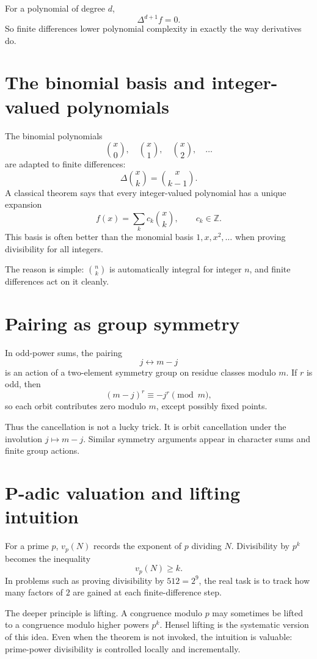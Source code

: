 For a polynomial of degree \(d\),
\[
  \Delta^{d+1}f=0.
\]
So finite differences lower polynomial complexity in exactly the way derivatives do.

\section{The binomial basis and integer-valued polynomials}

The binomial polynomials
\[
  \binom x0,\quad \binom x1,\quad \binom x2,\quad\ldots
\]
are adapted to finite differences:
\[
  \Delta\binom xk=\binom x{k-1}.
\]
A classical theorem says that every integer-valued polynomial has a unique expansion
\[
  f(x)=\sum_k c_k\binom xk,\qquad c_k\in\mathbb Z.
\]
This basis is often better than the monomial basis \(1,x,x^2,\ldots\) when proving divisibility for all integers.

The reason is simple: \(\binom nk\) is automatically integral for integer \(n\), and finite differences act on it cleanly.

\section{Pairing as group symmetry}

In odd-power sums, the pairing
\[
  j\longleftrightarrow m-j
\]
is an action of a two-element symmetry group on residue classes modulo \(m\).  If \(r\) is odd, then
\[
  (m-j)^r\equiv -j^r\pmod m,
\]
so each orbit contributes zero modulo \(m\), except possibly fixed points.

Thus the cancellation is not a lucky trick.  It is orbit cancellation under the involution \(j\mapsto m-j\).  Similar symmetry arguments appear in character sums and finite group actions.

\section{P-adic valuation and lifting intuition}

For a prime \(p\), \(v_p(N)\) records the exponent of \(p\) dividing \(N\).  Divisibility by \(p^k\) becomes the inequality
\[
  v_p(N)\ge k.
\]
In problems such as proving divisibility by \(512=2^9\), the real task is to track how many factors of \(2\) are gained at each finite-difference step.

The deeper principle is lifting.  A congruence modulo \(p\) may sometimes be lifted to a congruence modulo higher powers \(p^k\).  Hensel lifting is the systematic version of this idea.  Even when the theorem is not invoked, the intuition is valuable: prime-power divisibility is controlled locally and incrementally.

